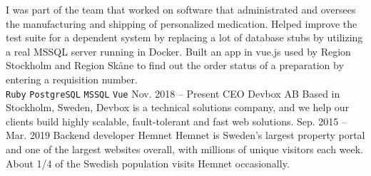 \documentclass[9pt]{template} %
\begin{document}
\begin{entrylist}
{      I was part of the team that worked on software that administrated and oversees the manufacturing and shipping of personalized medication. Helped improve the test suite for a dependent system by replacing a lot of database stubs by utilizing a real MSSQL server running in Docker. Built an app in vue.js used by Region Stockholm and Region Skåne to find out the order status of a preparation by entering a requisition number.\\
      \texttt{Ruby}\slashsep
      \texttt{PostgreSQL}\slashsep
      \texttt{MSSQL}\slashsep
      \texttt{Vue}
    }
  \entry
    {Nov. 2018 -- Present}
    {CEO}
    {Devbox AB}
    {Based in Stockholm, Sweden, Devbox is a technical solutions company, and we help our clients build highly scalable, fault-tolerant and fast web solutions.}
  \entry
    {Sep. 2015 -- Mar. 2019}
    {Backend developer}
    {Hemnet}
    {Hemnet is Sweden’s largest property portal and one of the largest websites overall, with millions of unique visitors each week. About 1/4 of the Swedish population visits Hemnet occasionally.\\

}
\end{entrylist}
\end{document}
